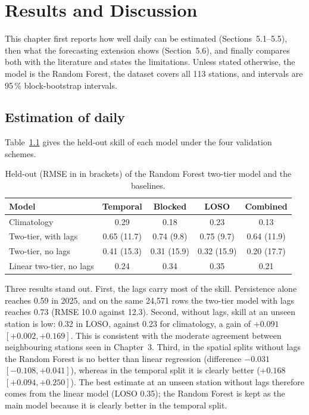 \chapter{Results and Discussion}

This chapter first reports how well daily \pmtf{} can be estimated (Sections~5.1--5.5), then what
the forecasting extension shows (Section~5.6), and finally compares both with the literature and
states the limitations. Unless stated otherwise, the model is the Random Forest, the dataset covers
all 113 stations, and intervals are 95\,\% block-bootstrap intervals.

\section{Estimation of daily \texorpdfstring{\pmtf{}}{PM2.5}}

Table~\ref{tab:overall} gives the held-out skill of each model under the four validation schemes.

\begin{table}[!htbp]
    \centering
    \small
    \begin{tabular}{l|c|c|c|c}
        \hline
        Model & Temporal & Blocked & LOSO & Combined \\
        \hline
        Climatology & 0.29 & 0.18 & 0.23 & 0.13 \\
        Two-tier, with lags & 0.65 (11.7) & 0.74 (9.8) & 0.75 (9.7) & 0.64 (11.9) \\
        Two-tier, no lags & 0.41 (15.3) & 0.31 (15.9) & 0.32 (15.9) & 0.20 (17.7) \\
        Linear two-tier, no lags & 0.24 & 0.34 & 0.35 & 0.21 \\
        \hline
    \end{tabular}
    \caption{Held-out \rsq{} (RMSE in \ugm{} in brackets) of the Random Forest two-tier model and the baselines.}
    \label{tab:overall}
\end{table}

Three results stand out. First, the \pmtf{} lags carry most of the skill. Persistence alone reaches
\rsq{} 0.59 in 2025, and on the same 24,571 rows the two-tier model with lags reaches 0.73 (RMSE 10.0
against 12.3\ugm{}). Second, without lags, skill at an unseen station is low: \rsq{} 0.32 in LOSO,
against 0.23 for climatology, a gain of $+0.091$ $[+0.002, +0.169]$. This is consistent with the
moderate agreement between neighbouring stations seen in Chapter~3. Third, in the spatial splits
without lags the Random Forest is no better than linear regression (difference $-0.031$
$[-0.108, +0.041]$), whereas in the temporal split it is clearly better ($+0.168$
$[+0.094, +0.250]$). The best estimate at an unseen station without lags therefore comes from the
linear model (LOSO \rsq{} 0.35); the Random Forest is kept as the main model because it is clearly
better in the temporal split.


